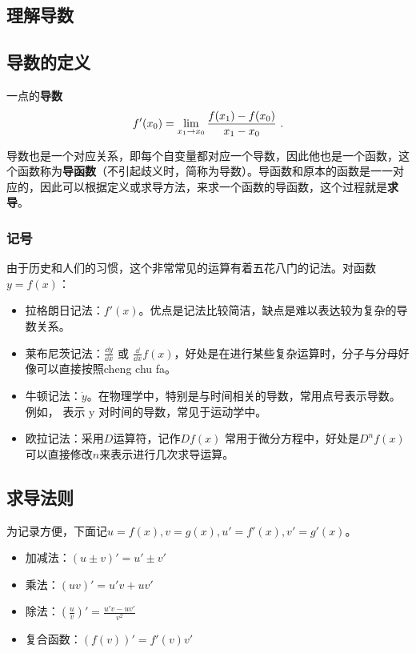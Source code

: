 
\begin{issues}
\issueDraft
\end{issues}

\subsection{理解导数}

\subsection{导数的定义}
一点的\textbf{导数}
\begin{equation}
f'(x_0)=\lim_{x_1\to x_0}{f(x_1)-f(x_0)\over x_1-x_0}~.
\end{equation}

导数也是一个对应关系，即每个自变量都对应一个导数，因此他也是一个函数，这个函数称为\textbf{导函数}（不引起歧义时，简称为导数）。导函数和原本的函数是一一对应的，因此可以根据定义或求导方法，来求一个函数的导函数，这个过程就是\textbf{求导}。

\subsubsection{记号}
由于历史和人们的习惯，这个非常常见的运算有着五花八门的记法。对函数$y=f(x)$：
\begin{itemize}
\item 拉格朗日记法：$f{\prime}(x)$。优点是记法比较简洁，缺点是难以表达较为复杂的导数关系。
\item 莱布尼茨记法：$\displaystyle\frac{\dd y}{\dd x}$  或  $\displaystyle\frac{\dd}{\dd x}f(x)$，好处是在进行某些复杂运算时，分子与分母好像可以直接按照cheng chu fa。
\item 牛顿记法：$\dot{y}$。在物理学中，特别是与时间相关的导数，常用点号表示导数。例如，   表示  y  对时间的导数，常见于运动学中。
\item 欧拉记法：采用$D$运算符，记作$Df(x)$  常用于微分方程中，好处是$D^n f(x)$可以直接修改$n$来表示进行几次求导运算。
\end{itemize}

\subsection{求导法则}

为记录方便，下面记$u=f(x),v=g(x),u'=f'(x),v'=g'(x)$。

\begin{itemize}
\item 加减法：$(u\pm v)'=u'\pm v'$
\item 乘法：$(uv)'=u'v+uv'$
\item 除法：$\displaystyle\left(\frac{u}{v}\right)'=\frac{u'v-uv'}{v^2}$
\item 复合函数：$(f(v))'=f'(v)v'$
\end{itemize}


